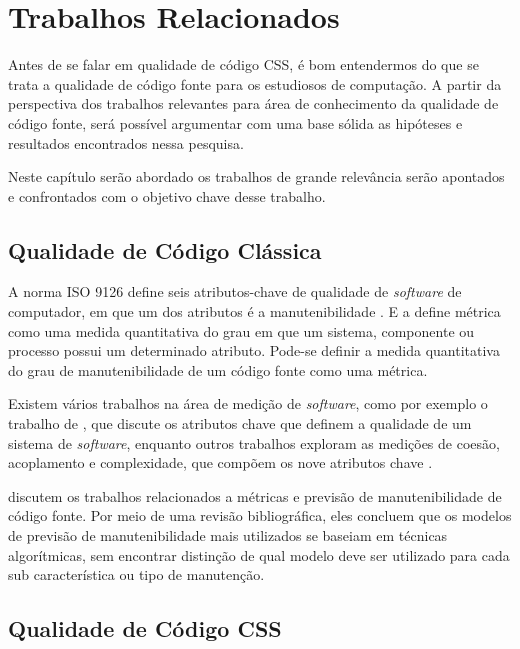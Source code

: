 %
%

\chapter{Trabalhos Relacionados}

Antes de se falar em qualidade de código CSS, é bom entendermos do que se trata a qualidade de código fonte para os estudiosos de computação. 
A partir da perspectiva dos trabalhos relevantes para área de conhecimento da qualidade de código fonte, será possível argumentar com uma base sólida as hipóteses e resultados encontrados nessa pesquisa.

Neste capítulo serão abordado os trabalhos de grande relevância serão apontados e confrontados com o objetivo chave desse trabalho.

\section{Qualidade de Código Clássica}

A norma ISO 9126 define seis atributos-chave de qualidade de \textit{software} de computador, em que um dos atributos é a manutenibilidade \cite{Pressman:2010}. E a  define métrica como uma medida quantitativa do grau em que um sistema, componente ou processo possui um determinado atributo. Pode-se definir a medida quantitativa do grau de manutenibilidade de um código fonte como uma métrica.

Existem vários trabalhos na área de medição de \textit{software}, como por exemplo o trabalho de , que discute os atributos chave que definem a qualidade de um sistema de \textit{software}, enquanto outros trabalhos exploram as medições de coesão, acoplamento e complexidade, que compõem os nove atributos chave \cite{McCabe:1989,Zuse:1991,Bieman1994,Dhama:1995,Zuse:1997} .

 discutem os trabalhos relacionados a métricas e previsão de manutenibilidade de código fonte. Por meio de uma revisão bibliográfica, eles concluem que os modelos de previsão de manutenibilidade mais utilizados se baseiam em técnicas algorítmicas, sem encontrar distinção de qual modelo deve ser utilizado para cada sub característica ou tipo de manutenção.

\section{Qualidade de Código CSS}

